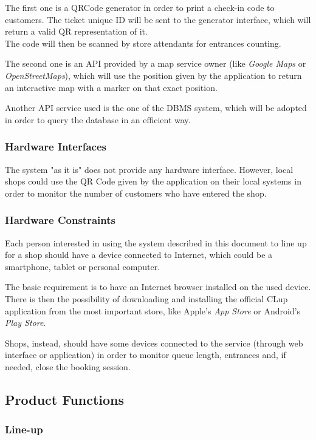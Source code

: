 \documentclass[table, 12pt]{article}
\begin{document}
The first one is a QRCode generator in order to print a check-in code to customers.
The ticket unique ID will be sent to the generator interface, which will return a valid QR representation of it.\\
The code will then be scanned by store attendants for entrances counting.

The second one is an API provided by a map service owner (like \textit{Google Maps} or \textit{OpenStreetMaps}), which will use the position given by the application to return an interactive map with a marker on that exact position.

Another API service used is the one of the DBMS system, which will be adopted in order to query the database in an efficient way.
\subsubsection{Hardware Interfaces}
The system "as it is" does not provide any hardware interface. However, local shops could use the QR Code given by the application on their local systems in order to monitor the number of customers who have entered the shop.
\subsubsection{Hardware Constraints}
Each person interested in using the system described in this document to line up for a shop should have a device connected to Internet, which could be a smartphone, tablet or personal computer.

The basic requirement is to have an Internet browser installed on the used device.
There is then the possibility of downloading and installing the official CLup application from the most important store, like Apple's \textit{App Store} or Android's \textit{Play Store}.

Shops, instead, should have some devices connected to the service (through web interface or application) in order to monitor queue length, entrances and, if needed, close the booking session.

\newpage

\subsection{Product Functions}

\subsubsection{Line-up}
\end{document}
